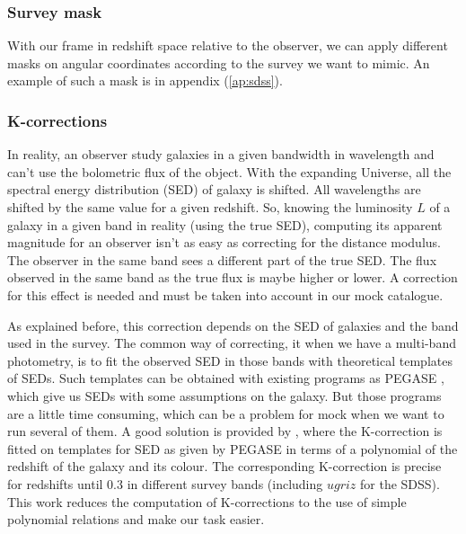 \subsubsection{Survey mask}
%
With our frame in redshift space relative to the observer, we can apply
different masks on angular coordinates according to the survey we want to
mimic. An example of such a mask is in appendix (\ref{ap:sdss}).
%
\subsubsection{K-corrections}
%
In reality, an observer study galaxies in a given bandwidth in wavelength and
can't use the bolometric flux of the object. With the expanding Universe, all
the spectral energy distribution (SED) of galaxy is shifted. All wavelengths
are shifted by the same value for a given redshift. So, knowing the luminosity
$L$ of a galaxy in a given band in reality (using the true SED), computing its
apparent magnitude for an observer isn't as easy as correcting for the distance
modulus. The observer in the same band sees a different part of the true SED\@.
The flux observed in the same band as the true flux is maybe higher or lower. A
correction for this effect is needed and must be taken into account in our mock
catalogue.

As explained before, this correction depends on the SED of galaxies and the
band used in the survey. The common way of correcting, it when we have a
multi-band photometry, is to fit the observed SED in those bands with
theoretical templates of SEDs. Such templates can be obtained with existing
programs as PEGASE , which give us SEDs with some
assumptions on the galaxy. But those programs are a little time consuming,
which can be a problem for mock when we want to run several of them. A good
solution is provided by \citet{Chilingarian+10}, where the K-correction is
fitted on templates for SED as given by PEGASE in terms of a polynomial of the
redshift of the galaxy and its colour. The corresponding K-correction is
precise for redshifts until 0.3 in different survey bands (including $ugriz$
for the SDSS). This work reduces the computation of K-corrections to the use of
simple polynomial relations and make our task easier.

